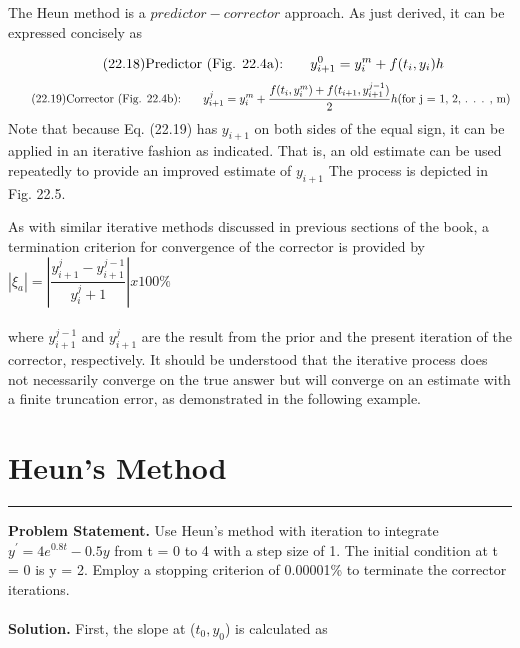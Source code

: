 \documentclass[../main.tex]{subfiles}
\begin{document}
The Heun method is a $predictor-corrector$ approach. As just derived, it can be expressed concisely as

\begin{equation}
\tag{22.18}
\textnormal{Predictor (Fig. 22.4a):} \; \; \; \; \; \; \; y^{0}_{i+1} = y^{m}_{i} + f(t_{i}, y_{i})h
\end{equation}
\begin{equation}
\tag{22.19}
\textnormal{Corrector (Fig. 22.4b):} \; \; \; \; \; \; \; y^{j}_{i+1} = y^{m}_{i} + \dfrac{ f(t_{i},y^{m}_{i}) + f(t_{i+1},y^{j-1}_{i+1}) }{ 2 }h
\textnormal{(for j = 1, 2, . . . , m)}
\end{equation}
Note that because Eq. (22.19) has $y_{i+1}$ on both sides of the equal sign, it can be applied in
an iterative fashion as indicated. That is, an old estimate can be used repeatedly to provide
an improved estimate of $y_{i+1}$ The process is depicted in Fig. 22.5.

As with similar iterative methods discussed in previous sections of the book, a termination criterion for convergence of the corrector is provided by
\\

$|\xi_{a}| = \left| \dfrac{y^{j}_{i+1} - y^{j-1}_{i+1}}{y^{j}_i+1} \right| x 100\% $
\\
\\
where $y^{j-1}_{i+1}$ and $y^{j}_{i+1}$ are the result from the prior and the present iteration of the corrector,
respectively. It should be understood that the iterative process does not necessarily converge on the true answer but will converge on an estimate with a finite truncation error, as
demonstrated in the following example.\\

\vspace{0,3in}
\section{Heun's Method}
\vspace{0,1in}
\hrule
\vspace{0,1in}
\textbf{Problem Statement.} Use Heun's method with iteration to integrate $y^{'} = 4e^{0.8t} - 0.5y$ from t = 0 to 4 with a step size of 1. The initial condition at t = 0 is y = 2. Employ a stopping criterion of 0.00001\% to terminate the corrector iterations.
\\
\vspace{0.2in}\\
\textbf{Solution.} First, the slope at ($t_{0}, y_{0}$) is calculated as\\
\end{document}
